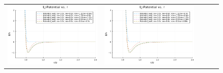 \begin{figure}[H]
  \centering
  \begin{tabular}{ccccc}
    \begin{minipage}[t]{0.2\hsize}
      \centering
      \includegraphics[width=\textwidth]{image/RaRtmap_LJ/LJ-Potential_Rt0.0.png}
      \subcaption{}
      \label{}
    \end{minipage} &
    \begin{minipage}[t]{0.2\hsize}
      \centering
      \includegraphics[width=\textwidth]{image/RaRtmap_LJ/LJ-Potential_Rt0.125.png}
      \subcaption{}
      \label{}
    \end{minipage} &
    \begin{minipage}[t]{0.2\hsize}
      \centering

\end{minipage}
\end{tabular}
\end{figure}
